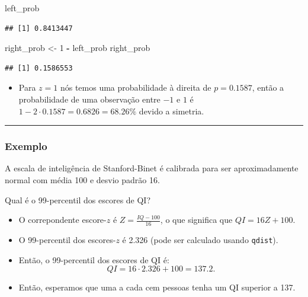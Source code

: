 \documentclass[]{article}
\newenvironment{Shaded}{\begin{snugshade}}{\end{snugshade}}
\newcommand{\DecValTok}[1]{\textcolor[rgb]{0.00,0.00,0.81}{#1}}
\newcommand{\StringTok}[1]{\textcolor[rgb]{0.31,0.60,0.02}{#1}}
\newcommand{\OperatorTok}[1]{\textcolor[rgb]{0.81,0.36,0.00}{\textbf{#1}}}
\newcommand{\NormalTok}[1]{#1}
\providecommand{\tightlist}{%
  \setlength{\itemsep}{0pt}\setlength{\parskip}{0pt}}
\begin{document}
\begin{Shaded}
\begin{Highlighting}[]
\NormalTok{left_prob}
\end{Highlighting}
\end{Shaded}

\begin{verbatim}
## [1] 0.8413447
\end{verbatim}

\begin{Shaded}
\begin{Highlighting}[]
\NormalTok{right_prob <-}\StringTok{ }\DecValTok{1} \OperatorTok{-}\StringTok{ }\NormalTok{left_prob}
\NormalTok{right_prob}
\end{Highlighting}
\end{Shaded}

\begin{verbatim}
## [1] 0.1586553
\end{verbatim}

\begin{itemize}
\tightlist
\item
  Para \(z=1\) nós temos uma probabilidade à direita de \(p=0.1587\),
  então a probabilidade de uma observação entre \(-1\) e \(1\) é
  \(1 - 2 \cdot 0.1587 = 0.6826 = 68.26\%\) devido a simetria.
\end{itemize}

\begin{center}\rule{0.5\linewidth}{\linethickness}\end{center}

\subsubsection{Exemplo}\label{exemplo}

A escala de inteligência de Stanford-Binet é calibrada para ser
aproximadamente normal com média 100 e desvio padrão 16.

Qual é o 99-percentil dos escores de QI?

\begin{itemize}
\tightlist
\item
  O correpondente escore-\(z\) é \(Z=\frac{IQ-100}{16}\), o que
  significa que \(QI=16Z+100\).
\item
  O 99-percentil dos escores-\(z\) é 2.326 (pode ser calculado usando
  \texttt{qdist}).
\item
  Então, o 99-percentil dos escores de QI é: \[
    QI=16\cdot 2.326+100=137.2.
    \]
\item
  Então, esperamos que uma a cada cem pessoas tenha um QI superior a
  137.
\end{itemize}
\end{document}
